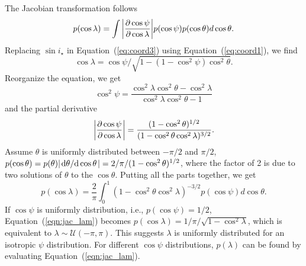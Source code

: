 \documentclass[twocolumn,times]{aastex631}
\begin{document}
The Jacobian transformation follows
\begin{equation}
    p(\cos{\lambda}) = \int \abs{\pdv{\cos{\psi}}{\cos{\lambda}}} p(\cos{\psi}) p(\cos{\theta}) d\cos{\theta}.
\end{equation}
Replacing $\sin{i_\star}$ in Equation~(\ref{eq:coord3}) using Equation~(\ref{eq:coord1}), we find 
\begin{equation}
    \cos{\lambda} = \cos{\psi}/\sqrt{1-(1-\cos^2{\psi})\cos^2{\theta}}.
\end{equation} 
Reorganize the equation, we get 
\begin{equation}
    \cos^2{\psi} = \frac{\cos^2{\lambda}\cos^2{\theta}-\cos^2{\lambda}}{\cos^2{\lambda}\cos^2{\theta}-1}
\end{equation}
and the partial derivative 
\begin{equation}
    \abs{\pdv{\cos{\psi}}{\cos{\lambda}}} = \frac{(1-\cos^2{\theta})^{1/2}}{(1-\cos^2{\theta}\cos^2{\lambda})^{3/2}}.
\end{equation}
Assume $\theta$ is uniformly distributed between $-\pi/2$ and $\pi/2$, $p(\cos{\theta}) = p(\theta) \abs{\dv*{\theta}{\cos{\theta}}} = 2/\pi/(1-\cos^2{\theta)^{1/2}}$, where the factor of 2 is due to two solutions of $\theta$ to the $\cos{\theta}$. Putting all the parts together, we get
\begin{equation}\label{eqn:jac_lam}
    p(\cos{\lambda}) = \frac{2}{\pi} \int_{0}^{1} (1-\cos^2{\theta}\cos^2{\lambda})^{-3/2} p(\cos{\psi}) d\cos{\theta}.
\end{equation}
If $\cos{\psi}$ is uniformly distribution, i.e., $p(\cos{\psi}) = 1/2$, Equation~(\ref{eqn:jac_lam}) becomes $p(\cos{\lambda}) = 1/\pi/\sqrt{1-\cos^2{\lambda}}$, which is equivalent to $\lambda \sim \mathcal{U}(-\pi, \pi)$. This suggests $\lambda$ is uniformly distributed for an isotropic $\psi$ distribution. For different $\cos{\psi}$ distributions, $p(\lambda)$ can be found by evaluating Equation~(\ref{eqn:jac_lam}).
\end{document}
